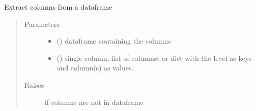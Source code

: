 \documentclass[letterpaper,10pt,english]{sphinxmanual}
\begin{document}

\begin{fulllineitems}
\label{\detokenize{dalio.util:dalio.util.extract_cols}}
Extract columns from a dataframe
\begin{quote}\begin{description}
\item[{Parameters}] \leavevmode\begin{itemize}
\item {} 
 () \textendash{} dataframe containing the columns

\item {} 
 (\sphinxstyleliteralemphasis{\sphinxupquote{, }}\sphinxstyleliteralemphasis{\sphinxupquote{, }}) \textendash{} single column, list of columnst
or dict with the level as keys and column(s) as values.

\end{itemize}

\item[{Raises}] \leavevmode
{} \textendash{} if columns are not in dataframe

\end{description}\end{quote}

\end{fulllineitems}

\end{document}
